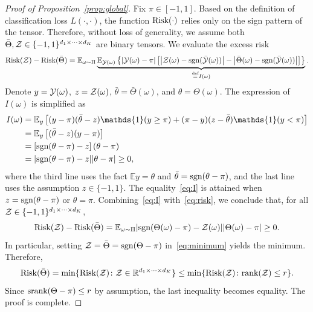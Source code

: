 \documentclass[11pt]{article}
\theoremstyle{plain}
\theoremstyle{definition}
\newcommand*{\KeepStyleUnderBrace}[1]{%
  \mathop{%
    \mathchoice
    {\underbrace{\displaystyle#1}}%
    {\underbrace{\textstyle#1}}%
    {\underbrace{\scriptstyle#1}}%
    {\underbrace{\scriptscriptstyle#1}}%
  }\limits
}
\def\sign{\textup{sgn}}
\def\srank{\textup{srank}}
\def\rank{\textup{rank}}
\def\risk{\textup{Risk}}
\begin{document}
\begin{proof}[Proof of Proposition~\ref{prop:global}]
Fix $\pi\in[-1,1]$. Based on the definition of classification loss $L(\cdot,\cdot)$, the function $\risk(\cdot)$ relies only on the sign pattern of the tensor. Therefore, without loss of generality, we assume both $\bar \Theta, \mathcal{Z} \in\{-1,1\}^{d_1\times \cdots \times d_K}$ are binary tensors. 
We evaluate the excess risk 
\begin{equation}\label{eq:risk}
\risk(\tZ)- \risk(\bar \Theta) = \mathbb{E}_{\omega\sim \Pi}\KeepStyleUnderBrace{\mathbb{E}_{\tY(\omega)}\left\{|\tY(\omega)-\pi|\left[\left|\tZ(\omega)-\sign(\bar \tY(\omega)) \right|-\left|\bar\Theta(\omega)-\sign(\bar \tY(\omega))\right|\right]\right\}}_{\stackrel{\text{def}}{=}I(\omega)}.
\end{equation}
Denote $y=\mathcal{Y}(\omega)$, $z=\mathcal{Z}(\omega)$, $\bar \theta=\bar\Theta(\omega)$, and $\theta=\Theta(\omega)$. The expression of $I(\omega)$ is simplified as
\begin{align}\label{eq:I}
I(\omega)&= \mathbb{E}_{y}\left[ (y-\pi)(\bar \theta-z)\mathds{1}(y\geq \pi)+(\pi-y)(z-\bar \theta)\mathds{1}(y< \pi)\right]\notag \\
&= \mathbb{E}_{y}\left[(\bar \theta-z) (y-\pi)\right]\notag \\
&=  \left[\sign(\theta-\pi)-z\right]\left(\theta-\pi\right)\notag \\
&= |\sign(\theta-\pi)-z||\theta-\pi|\geq 0,
\end{align}
where the third line uses the fact $\mathbb{E}y=\theta$ and $\bar \theta=\sign(\theta-\pi)$, and the last line uses the assumption $z \in\{-1,1\}$. The equality~\eqref{eq:I} is attained when $z=\sign(\theta-\pi)$ or $\theta=\pi$. Combining~\eqref{eq:I} with~\eqref{eq:risk}, we conclude that, for all $\mathcal{Z}\in\{-1,1\}^{d_1\times \cdots \times d_K}$, 
\begin{equation}\label{eq:minimum}
\risk(\tZ)- \risk(\bar \Theta) = \mathbb{E}_{\omega\sim \Pi} |\sign(\Theta(\omega)-\pi)-\tZ(\omega)||\Theta(\omega)-\pi|\geq 0.
\end{equation}
In particular, setting $\tZ=\bar \Theta=\sign(\Theta-\pi)$ in~\eqref{eq:minimum} yields the minimum. Therefore, 
\[
\risk(\bar \Theta)=\min\{\risk(\tZ)\colon \tZ\in \mathbb{R}^{d_1\times \cdots \times d_K}\} \leq \min\{\risk(\tZ)\colon \rank(\tZ)\leq r\}.
\]
Since $\srank(\Theta-\pi)\leq r$ by assumption, the last inequality becomes equality. The proof is complete. 
\end{proof}
\end{document}
